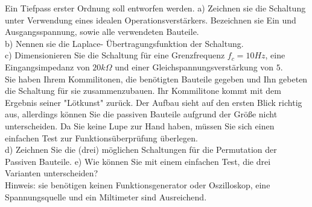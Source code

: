 \documentclass[A4]{scrartcl}
\begin{document}
  Ein Tiefpass erster Ordnung soll entworfen werden.
  a) Zeichnen sie die Schaltung unter Verwendung eines idealen Operationsverstärkers.
  Bezeichnen sie Ein und Ausgangsspannung, sowie alle verwendeten Bauteile.\\
  b) Nennen sie die Laplace- Übertragungsfunktion der Schaltung.\\
  c) Dimensionieren Sie die Schaltung für eine Grenzfrequenz $f_c = 10Hz$, eine Eingangsimpedanz von $20k\Omega$ und einer Gleichspannungsverstärkung von $5$.\\
  Sie haben Ihrem Kommilitonen, die benötigten Bauteile gegeben und Ihn gebeten die Schaltung für sie zusammenzubauen. 
  Ihr Kommilitone kommt mit dem Ergebnis seiner "Lötkunst" zurück.
  Der Aufbau sieht auf den ersten Blick richtig aus, allerdings können Sie die passiven Bauteile aufgrund der Größe nicht unterscheiden. 
  Da Sie keine Lupe zur Hand haben, müssen Sie sich einen einfachen Test zur Funktionsüberprüfung überlegen.\\
  d) Zeichnen Sie die (drei) möglichen Schaltungen für die Permutation der Passiven Bauteile.
  e) Wie können Sie mit einem einfachen Test, die drei Varianten unterscheiden?\\
  Hinweis: sie benötigen keinen Funktionsgenerator oder Oszilloskop, eine Spannungsquelle und ein Miltimeter sind Ausreichend.\\
\end{document}
